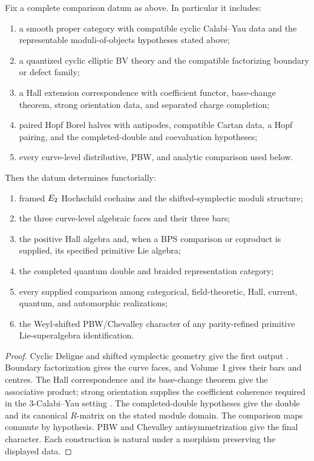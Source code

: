 \begin{theorem}
Fix a complete comparison datum as above. In particular it includes:
\begin{enumerate}
\item a smooth proper category with compatible cyclic Calabi--Yau data
and the representable moduli-of-objects hypotheses stated above;
\item a quantized cyclic elliptic BV theory and the compatible factorizing boundary or defect family;
\item a Hall extension correspondence with coefficient functor, base-change theorem, strong orientation data, and separated charge completion;
\item paired Hopf Borel halves with antipodes, compatible Cartan data,
a Hopf pairing, and the completed-double and coevaluation hypotheses;
\item every curve-level distributive, PBW, and analytic comparison used below.
\end{enumerate}
Then the datum determines functorially:
\begin{enumerate}
\item framed $E_2$ Hochschild cochains and the shifted-symplectic moduli structure;
\item the three curve-level algebraic faces and their three bars;
\item the positive Hall algebra and, when a BPS comparison or coproduct
is supplied, its specified primitive Lie algebra;
\item the completed quantum double and braided representation category;
\item every supplied comparison among categorical, field-theoretic, Hall, current, quantum, and automorphic realizations;
\item the Weyl-shifted PBW/Chevalley character of any parity-refined primitive Lie-superalgebra identification.
\end{enumerate}
\end{theorem}
\begin{proof}
Cyclic Deligne and shifted symplectic geometry give the first output \cite{BravRozenblyum,PTVV,BravDyckerhoff}.  Boundary factorization gives the curve faces, and Volume~I gives their bars and centres.  The Hall correspondence and its base-change theorem give the associative product; strong orientation supplies the coefficient coherence required in the $3$-Calabi--Yau setting \cite{KPS}.  The completed-double hypotheses give the double and its canonical
$R$-matrix on the stated module domain.  The comparison maps commute by hypothesis.  PBW and Chevalley antisymmetrization give the final character.  Each construction is natural under a morphism preserving the displayed data.
\end{proof}

